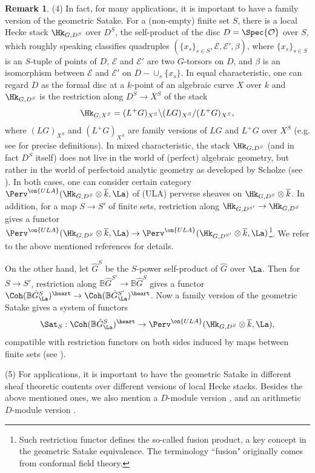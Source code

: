 \documentclass[11pt]{amsart}
\theoremstyle{definition}
\theoremstyle{definition}
\newtheorem{rmk}[thm]{Remark}
\theoremstyle{definition}
\numberwithin{equation}{section}
\newcommand{\bB}{{\mathbb B}}
\newcommand{\mE}{{\mathcal E}}
\newcommand{\mO}{{\mathcal O}}
\begin{document}
\begin{rmk}
(4) In fact, for many applications, it is important to have a family version of the geometric Satake. For a (non-empty) finite set $S$,
there is a local Hecke stack $\Hk_{G,D^S}$ over $D^S$, the self-product of the disc $D=\Spec \mO$ over $S$, which roughly speaking classifies quadruples $(\{x_s\}_{s\in S}, \mE,\mE',\beta)$, where $\{x_s\}_{s\in S}$ is an $S$-tuple of points of $D$, $\mE$ and $\mE'$ are two $G$-torsors on $D$, and $\beta$ is an isomorphism between $\mE$ and $\mE'$ on $D-\cup_{s} \{x_s\}$. In equal characteristic, one can regard $D$ as the formal disc at a $k$-point of an algebraic curve $X$ over $k$ and $\Hk_{G,D^S}$ is the restriction along $D^S\to X^S$ of the stack 
\[
\Hk_{G, X^S}=(L^+G)_{X^S}\backslash (LG)_{X^S}/(L^+G)_{X^S},
\] 
where $(LG)_{X^S}$ and $(L^+G)_{X^S}$ are family versions of $LG$ and $L^+G$ over $X^S$ (e.g. see \cite[Sect. 3.1]{Zhu-PCMI} for precise definitions). In mixed characteristic, the stack $\Hk_{G,D^S}$ (and in fact $D^S$ itself) does not live in the world of (perfect) algebraic geometry, but rather in the world of perfectoid analytic geometry as developed by Scholze  (see \cite{Scholze-Berkeley, Fargues-Scholze-Geometrization}). In both cases, one can consider certain category $\Perv^{\on{ULA}}(\Hk_{G,D^S}\otimes\overline k,\La)$ of (ULA) perverse sheaves on $\Hk_{G,D^S}\otimes\overline k$. In addition, for a map $S\to S'$ of finite sets, restriction along $\Hk_{G,D^{S'}}\to\Hk_{G,D^S}$ gives a functor $\Perv^{\on{ULA}}(\Hk_{G,D^S}\otimes\overline k,\La)\to \Perv^{\on{ULA}}(\Hk_{G,D^{S'}}\otimes\overline k,\La)$\footnote{Such restriction functor defines the so-called fusion product,  a key concept in the geometric Satake equivalence. The terminology ``fusion" originally comes from conformal field theory.}. We refer to the above mentioned references for details.

On the other hand, let $\hat{G}^S$ be the $S$-power self-product of $\hat{G}$ over $\La$. Then for $S\to S'$, restriction along $\bB \hat{G}^{S'}\to \bB \hat{G}^S$ gives a functor $\Coh(\bB \hat{G}_{\La}^S)^\heart\to \Coh(\bB \hat{G}_{\La}^{S'})^\heart$.
Now a family version of the geometric Satake gives a system of functors
\begin{equation}\label{factorizable Sat}
\Sat_S: \Coh( \bB \hat{G}_{\La}^S)^\heart\to \Perv^{\on{ULA}}(\Hk_{G,D^S}\otimes\overline k,\La),
\end{equation}
compatible with restriction functors on both sides induced by maps between finite sets (see \cite{Gaitsgory-deJong, Zhu-PCMI}).

(5) For applications, it is important to have the geometric Satake in different sheaf theoretic contents over different versions of local Hecke stacks. Besides the above mentioned ones, we also mention a $D$-module version \cite{Beilinson-Drinfeld-Hitchin}, and an arithmetic $D$-module version \cite{Xu-Zhu-Bessel}.
\end{rmk}
\end{document}
